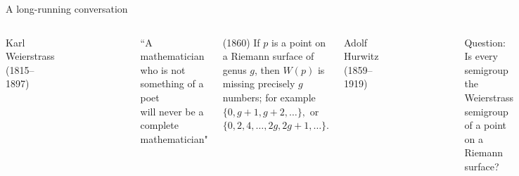 \documentclass[12pt, aspectratio=169]{beamer}
\begin{document}
 \begin{frame}{A long-running conversation}
 
\begin{columns}
\alert{Karl Weierstrass} (1815--1897)
\begin{figure}
    \flushleft
    \includegraphics[width=.3\textwidth]{"KarlWeierstrassSmall.pdf"}
\end{figure}
  
\begin{small}
 ``A mathematician who is not something of a poet\\ will never be a complete mathematician" 
\end{small}
 \smallskip
 
(1860) If $p$ is a point on a Riemann surface of genus $g$,
 then $W(p)$ is missing precisely $g$ numbers; for example
 $
\{0,g+1,g+2,\dots\},
 $
 or
$
\{0,2, 4,\dots, 2g, 2g+1,\dots\}.
 $
 
\alert{Adolf Hurwitz} (1859--1919)
\begin{figure}
    \flushleft
    \includegraphics[width=.4\textwidth]{"Adolf_Hurwitz.jpg"}
\end{figure}
\begin{small}
 \begin{block}{Question:}
Is every semigroup the Weierstrass semigroup of a point
on a Riemann surface?
\end{block}
 \end{small}
\end{columns}

\end{frame}
\end{document}
